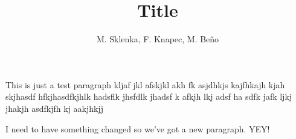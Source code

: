 \documentclass[12pt,a4paper,draft]{article}
\title{Title}
\author{M. Sklenka, F. Knapec, M. Beňo}
\date{}
\begin{document}
\maketitle

This is just a test paragraph kljaf jkl afskjkl akh fk asjdhkjs
kajfhkajh  kjah skjhasdf  hfkjhasdfkjhlk hadsflk jhsfdlk jhadsf
k afkjh lkj adsf  ha sdfk jafk ljkj jhakjh asdfkjfh kj aakjhkjj

I need to have something changed so we've got a new paragraph. YEY!
\end{document}
